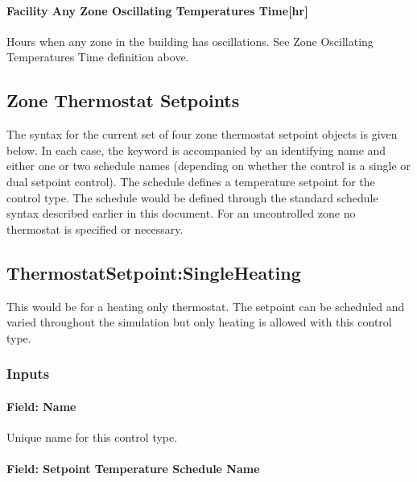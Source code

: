 \paragraph{Facility Any Zone Oscillating Temperatures Time{[}hr{]}}\label{facility-any-zone-oscillating-temperatures-timehr}

Hours when any zone in the building has oscillations. See Zone Oscillating Temperatures Time definition above.

\subsection{Zone Thermostat Setpoints}\label{zone-thermostat-setpoints}

The syntax for the current set of four zone thermostat setpoint objects is given below. In each case, the keyword is accompanied by an identifying name and either one or two schedule names (depending on whether the control is a single or dual setpoint control). The schedule defines a temperature setpoint for the control type. The schedule would be defined through the standard schedule syntax described earlier in this document. For an uncontrolled zone no thermostat is specified or necessary.

\subsection{ThermostatSetpoint:SingleHeating}\label{thermostatsetpointsingleheating}

This would be for a heating only thermostat. The setpoint can be scheduled and varied throughout the simulation but only heating is allowed with this control type.

\subsubsection{Inputs}\label{inputs-1-051}

\paragraph{Field: Name}\label{field-name-1-049}

Unique name for this control type.

\paragraph{Field: Setpoint Temperature Schedule Name}\label{field-setpoint-temperature-schedule-name-002}

